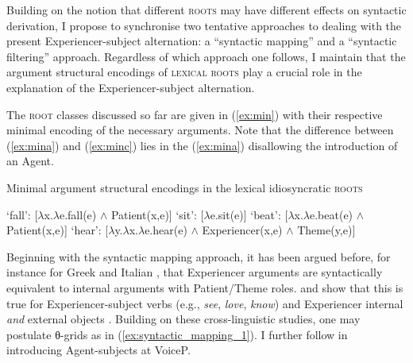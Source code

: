 \documentclass[output=paper,colorlinks,citecolor=brown]{langscibook}
\begin{document}
Building on the notion that different \textsc{roots} may have different effects on syntactic derivation, I propose to synchronise two tentative approaches to dealing with the present Experiencer-subject alternation: a “syntactic mapping” and a “syntactic filtering” approach. Regardless of which approach one follows, I maintain that the argument structural encodings of \textsc{lexical roots} play a crucial role in the explanation of the Experiencer-subject alternation. 

The  \textsc{root} classes discussed so far are given in (\ref{ex:min}) with their respective minimal encoding of the necessary arguments. Note that the difference between (\ref{ex:mina}) and (\ref{ex:minc}) lies in the  (\ref{ex:mina}) disallowing the introduction of an Agent.

\begin{exe}  \ex Minimal argument structural encodings in the lexical idiosyncratic \textsc{roots}\label{ex:min}
\begin{xlist}
    \ex  {} `fall': [$\lambda$x.$\lambda$e.fall(e) $\wedge$ Patient(x,e)] \label{ex:mina}
\ex {} `sit': [$\lambda$e.sit(e)] \label{ex:minb}
\ex {} `beat': [$\lambda$x.$\lambda$e.beat(e) $\wedge$ Patient(x,e)] \label{ex:minc}
\ex {} `hear': [$\lambda$y.$\lambda$x.$\lambda$e.hear(e) $\wedge$ Experiencer(x,e) $\wedge$ Theme(y,e)] \label{ex:mind}
\end{xlist}
\end{exe}

 Beginning with the syntactic mapping approach, it has been argued before, for instance for Greek \citep{anagnostopoulou_experiencers_1999} and Italian \citep{belletti_psych-verbs_1988}, that Experiencer arguments are syntactically equivalent to internal arguments with Patient/Theme roles. \citet{belletti_psych-verbs_1988} and \citet{anagnostopoulou_experiencers_1999} show that this is true for Experiencer-subject verbs (e.g., \textit{see}, \textit{love}, \textit{know}) and Experiencer internal \textit{and} external objects \citep{anagnostopoulou_experiencers_1999}. Building on these cross-linguistic studies, one may postulate θ-grids as in (\ref{ex:syntactic_mapping_1}). I further follow \citet{Kratzer1996} in introducing Agent-subjects at VoiceP.
\end{document}
